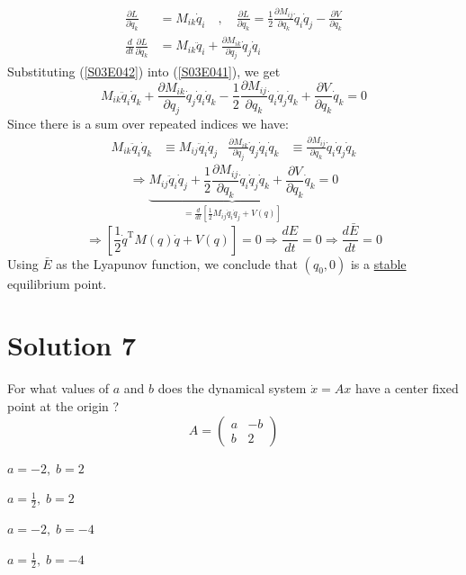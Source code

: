 \documentclass[twoside,10pt,a4paper]{article}
\begin{document}
\begin{equation}\label{S03E042}
	\begin{aligned}
		\frac{\partial L}{\partial \dot{q}_k} &= M_{ik}\dot{q}_i \quad , \quad \frac{\partial L}{\partial q_k} = \frac{1}{2} \frac{\partial M_{ij}}{\partial q_k}\dot{q}_i\dot{q}_j - \frac{\partial V}{\partial q_k} \\
		\frac{d}{dt} \frac{\partial L}{\partial \dot{q}_k} &= M_{ik}\ddot{q}_i + \frac{\partial M_{ik}}{\partial q_j}\dot{q}_j\dot{q}_i
	\end{aligned}
\end{equation}
Substituting (\ref{S03E042}) into (\ref{S03E041}), we get
\begin{equation*}
	M_{ik} \ddot{q}_i\dot{q}_k + \frac{\partial M_{ik}}{\partial q_j}\dot{q}_j\dot{q}_i\dot{q}_k - \frac{1}{2}\frac{\partial M_{ij}}{\partial q_k}\dot{q}_i\dot{q}_j\dot{q}_k + \frac{\partial V}{\partial q_k}\dot{q}_k = 0
\end{equation*}
Since there is a sum over repeated indices we have:
\begin{align*}
	M_{ik}\ddot{q}_i\dot{q}_k &\equiv M_{ij}\ddot{q}_i\dot{q}_j & \frac{\partial M_{ik}}{\partial q_j}\dot{q}_j\dot{q}_i\dot{q}_k &\equiv \frac{\partial M_{ij}}{\partial q_k}\dot{q}_i\dot{q}_j\dot{q}_k
\end{align*}
\begin{equation}
	\Longrightarrow \underbrace{M_{ij}\ddot{q}_i\dot{q}_j + \frac{1}{2} \frac{\partial M_{ij}}{\partial q_k}\dot{q}_i\dot{q}_j\dot{q}_k + \frac{\partial V}{\partial q_k}\dot{q}_k}_{ \displaystyle =\frac{d}{dt}\left[ \frac{1}{2}M_{ij}\dot{q}_i\dot{q}_j+V(q) \right]} = 0
\end{equation}
\begin{equation*}
	\Longrightarrow \left[ \frac{1}{2}\dot{q}^\text{T}M(q)\dot{q} + V(q) \right] = 0 \Longrightarrow \frac{dE}{dt}=0 \Longrightarrow \frac{d\bar{E}}{dt}=0
\end{equation*}
Using $\bar{E}$ as the Lyapunov function, we conclude that $(q_0,0)$ is a \underline{stable} equilibrium point.

\newpage

\section*{Solution 7}
For what values of $a$ and $b$ does the dynamical system $\dot{x} = Ax$ have a center fixed point at the origin ?
\begin{equation*}
	A = \begin{pmatrix}
		a & -b \\ b & 2
	\end{pmatrix}
\end{equation*}
\begin{enumerate}[label=(\alph*)]
	{\color{MyRed} \item $\displaystyle a = -2, \; b = 2 $}
	\item $\displaystyle a = \frac{1}{2}, \; b = 2 $
	\item $\displaystyle a = -2, \; b = -4 $
	\item $\displaystyle a = \frac{1}{2}, \; b = -4 $
\end{enumerate}
\end{document}

